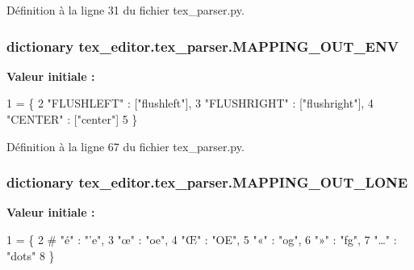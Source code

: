 Définition à la ligne 31 du fichier tex\+\_\+parser.\+py.

\hypertarget{namespacetex__editor_1_1tex__parser_ab7ad6067629950c1f03f0609a767a1bd}{}
\subsubsection[{M\+A\+P\+P\+I\+N\+G\+\_\+\+O\+U\+T\+\_\+\+E\+N\+V}]{\setlength{\rightskip}{0pt plus 5cm}dictionary tex\+\_\+editor.\+tex\+\_\+parser.\+M\+A\+P\+P\+I\+N\+G\+\_\+\+O\+U\+T\+\_\+\+E\+N\+V}\label{namespacetex__editor_1_1tex__parser_ab7ad6067629950c1f03f0609a767a1bd}
{\bfseries Valeur initiale \+:}
\begin{DoxyCode}
1 = \{
2 \textcolor{stringliteral}{"FLUSHLEFT"} : [\textcolor{stringliteral}{"flushleft"}],
3 \textcolor{stringliteral}{"FLUSHRIGHT"} : [\textcolor{stringliteral}{"flushright"}],
4 \textcolor{stringliteral}{"CENTER"} : [\textcolor{stringliteral}{"center"}]
5 \}
\end{DoxyCode}


Définition à la ligne 67 du fichier tex\+\_\+parser.\+py.

\hypertarget{namespacetex__editor_1_1tex__parser_a740e1c1c007458cc3eadbdb1b09a09f8}{}
\subsubsection[{M\+A\+P\+P\+I\+N\+G\+\_\+\+O\+U\+T\+\_\+\+L\+O\+N\+E}]{\setlength{\rightskip}{0pt plus 5cm}dictionary tex\+\_\+editor.\+tex\+\_\+parser.\+M\+A\+P\+P\+I\+N\+G\+\_\+\+O\+U\+T\+\_\+\+L\+O\+N\+E}\label{namespacetex__editor_1_1tex__parser_a740e1c1c007458cc3eadbdb1b09a09f8}
{\bfseries Valeur initiale \+:}
\begin{DoxyCode}
1 = \{
2 \textcolor{comment}{# "é" : "'e",}
3 \textcolor{stringliteral}{"œ"} : \textcolor{stringliteral}{"oe"},
4 \textcolor{stringliteral}{"Œ"} : \textcolor{stringliteral}{"OE"},
5 \textcolor{stringliteral}{"«"} : \textcolor{stringliteral}{"og"},
6 \textcolor{stringliteral}{"»"} : \textcolor{stringliteral}{"fg"},
7 \textcolor{stringliteral}{"…"} : \textcolor{stringliteral}{"dots"}
8 \}
\end{DoxyCode}


